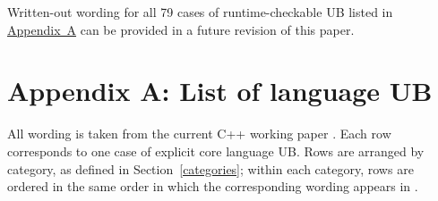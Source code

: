 Written-out wording for all 79 cases of runtime-checkable UB listed in \hyperref[appendix]{Appendix~A} can be provided in a future revision of this paper.

\section*{Appendix A: List of language UB}
\label{appendix}

All wording is taken from the current C++ working paper \cite{N5008}. Each row corresponds to one case of explicit core language UB. Rows are arranged by category, as defined in Section~\ref{categories}; within each category, rows are ordered in the same order in which the corresponding wording appears in \cite{N5008}.


